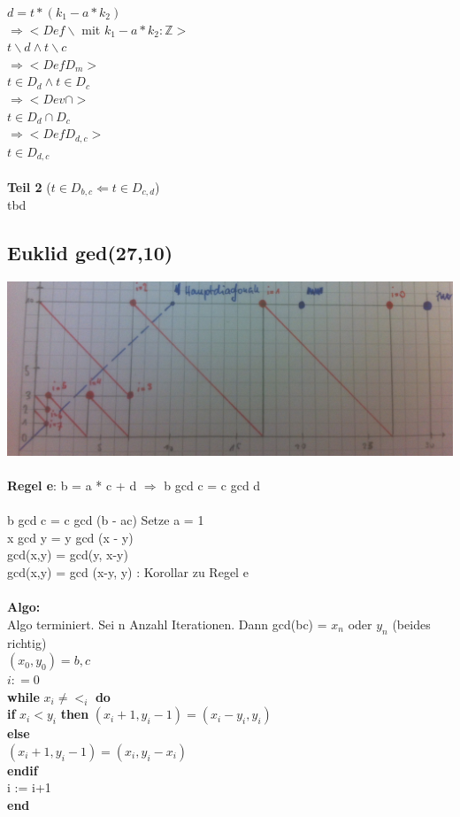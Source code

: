 \documentclass[a4paper,10pt]{article}
\newcommand{\ZN}{\mathbb{Z}} %
\newcommand{\Bold}[1]{\textbf{#1}} %
\newcommand{\Ra}{\Rightarrow}
\newcommand{\La}{\Leftarrow}
\begin{document}
\begin{description}
	$d = t*(k_1 - a*k_2)$ \\
	$\Ra <Def \backslash$ mit $k_1 - a*k_2 : \ZN >$ \\
	$t \backslash d \wedge t \backslash c$ \\
	$\Ra <Def D_m>$ \\
	$t \in D_d \wedge t\in D_c$ \\
	$\Ra <Dev \cap>$ \\
	$t \in D_d \cap D_c$ \\
	$\Ra <Def D_{d,c}>$ \\
	$t \in D_{d,c}$ \\
	\\
	\Bold {Teil 2} ($t \in D_{b,c} \La t \in D_{c,d}$) \\
	tbd
\end{description}

\subsection{Euklid ged(27,10)} 
\includegraphics[scale=0.4]{euklid.png} \\
\\
\Bold {Regel e}: b = a * c + d $\Ra$ b gcd c = c gcd d \\
\\
b gcd c = c gcd (b - ac) Setze a = 1 \\
x gcd y = y gcd (x - y) \\
gcd(x,y) = gcd(y, x-y) \\
gcd(x,y) = gcd (x-y, y) : Korollar zu Regel e \\
\\
\Bold {Algo:} \\
Algo terminiert. Sei n Anzahl Iterationen. Dann gcd(bc) = $x_n$ oder $y_n$ (beides richtig) \\
$(x_0, y_0) = b, c$ \\
$i : = 0 $ \\
\Bold {while} $x_i \neq <_i$ \Bold {do} \\
	\Bold {if}  $x_i<y_i$ \Bold {then}
	$(x_i+1,y_i-1) = (x_i - y_i, y_i)$ \\
	\Bold {else} \\
	$(x_i+1,y_i-1) = (x_i,  y_i - x_i)$ \\
	\Bold {endif} \\
	i := i+1 \\
\Bold {end}
\end{document}

